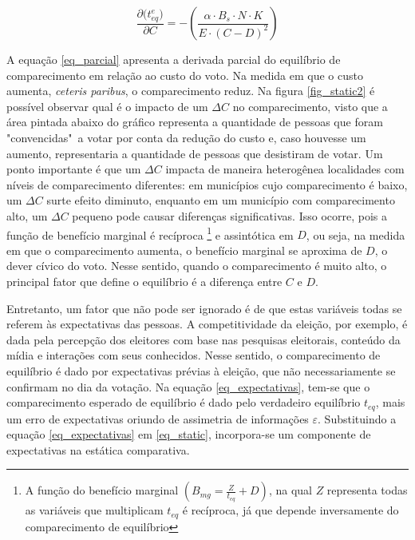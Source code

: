 % 
% 

\begin{equation}
\label{eq_parcial}
    \frac{\partial{(t_{eq}^e})}{\partial C} = -\left(\frac{\alpha\cdot B_s\cdot N\cdot K}{E\cdot (C-D)^2}\right)
\end{equation}

A equação \ref{eq_parcial} apresenta a derivada parcial do equilíbrio de comparecimento em relação ao custo do voto. Na medida em que o custo aumenta, \textit{ceteris paribus}, o comparecimento reduz. Na figura \ref{fig_static2} é possível observar qual é o impacto de um $\Delta C$ no comparecimento, visto que a área pintada abaixo do gráfico representa a quantidade de pessoas que foram "convencidas"\  a votar por conta da redução do custo e, caso houvesse um aumento, representaria a quantidade de pessoas que desistiram de votar. Um ponto importante é que um $\Delta C$ impacta de maneira heterogênea localidades com níveis de comparecimento diferentes: em municípios cujo comparecimento é baixo, um $\Delta C$ surte efeito diminuto, enquanto em um município com comparecimento alto, um $\Delta C$ pequeno pode causar diferenças significativas. Isso ocorre, pois a função de benefício marginal é recíproca
\footnote{A função do benefício marginal $(B_{mg}=\frac{Z}{t_{eq}} + D)$, na qual $Z$ representa todas as variáveis que multiplicam $t_{eq}$ é recíproca, já que depende inversamente do comparecimento de equilíbrio} 
e assintótica em $D$, ou seja, na medida em que o comparecimento aumenta, o benefício marginal se aproxima de $D$, o dever cívico do voto. Nesse sentido, quando o comparecimento é muito alto, o principal fator que define o equilíbrio é a diferença entre $C$ e $D$.

Entretanto, um fator que não pode ser ignorado é de que estas variáveis todas se referem às expectativas das pessoas. A competitividade da eleição, por exemplo, é dada pela percepção dos eleitores com base nas pesquisas eleitorais, conteúdo da mídia e interações com seus conhecidos. Nesse sentido, o comparecimento de equilíbrio é dado por expectativas prévias à eleição, que não necessariamente se confirmam no dia da votação. Na equação \ref{eq_expectativas}, tem-se que o comparecimento esperado de equilíbrio é dado pelo verdadeiro equilíbrio $t_{eq}$, mais um erro de expectativas oriundo de assimetria de informações $\varepsilon$. Substituindo a equação \ref{eq_expectativas} em \ref{eq_static}, incorpora-se um componente de expectativas na estática comparativa.

